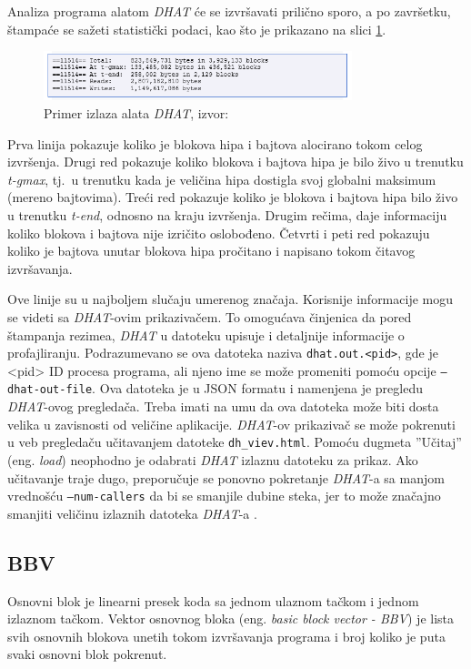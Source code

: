 \documentclass[12pt,oneside]{memoir}
\theoremstyle{plain}
\theoremstyle{definition}
\begin{document}
Analiza programa alatom \textit{DHAT} će se izvršavati prilično sporo, a po završetku, štampaće se sažeti statistički podaci, kao što je prikazano na slici \ref{fig:slika2.24}.
\begin{figure}[!ht]
  \centering
  \includegraphics[width=0.8\textwidth]{DHAT.png}
  \caption{Primer izlaza alata \textit{DHAT}, izvor: \cite{DHAT}}
  \label{fig:slika2.24}
\end{figure}

Prva linija pokazuje koliko je blokova hipa i bajtova alocirano tokom celog izvršenja. Drugi red pokazuje koliko blokova i bajtova hipa je bilo živo u trenutku \textit{t-gmax}, tj.~u trenutku kada je veličina hipa dostigla svoj globalni maksimum (mereno bajtovima). Treći red pokazuje koliko je blokova i bajtova hipa bilo živo u trenutku \textit{t-end}, odnosno na kraju izvršenja. Drugim rečima, daje informaciju koliko blokova i bajtova nije izričito oslobođeno. Četvrti i peti red pokazuju koliko je bajtova unutar blokova hipa pročitano i napisano tokom čitavog izvršavanja.

Ove linije su u najboljem slučaju umerenog značaja. Korisnije informacije mogu se videti sa \textit{DHAT}-ovim prikazivačem. To omogućava činjenica da pored štampanja rezimea, \textit{DHAT} u datoteku upisuje i detaljnije informacije o profajliranju. Podrazumevano se ova datoteka naziva \texttt{dhat.out.<pid>}, gde je <pid> ID procesa programa, ali njeno ime se može promeniti pomoću opcije \texttt{--dhat-out-file}. Ova datoteka je u JSON formatu i namenjena je pregledu \textit{DHAT}-ovog pregledača. Treba imati na umu da ova datoteka može biti dosta velika u zavisnosti od veličine aplikacije. 
\textit{DHAT}-ov prikazivač se može pokrenuti u veb pregledaču učitavanjem datoteke \texttt{dh\_viev.html}. Pomoću dugmeta ''Učitaj'' (eng. \textit{load}) neophodno je odabrati \textit{DHAT} izlaznu datoteku za prikaz. Ako učitavanje traje dugo, preporučuje se ponovno pokretanje \textit{DHAT}-a sa manjom vrednošću \texttt{--num-callers} da bi se smanjile dubine steka, jer to može značajno smanjiti veličinu izlaznih datoteka \textit{DHAT}-a \cite{DHAT}. 

\subsection{BBV}
Osnovni blok je linearni presek koda sa jednom ulaznom tačkom i jednom izlaznom tačkom. Vektor osnovnog bloka (eng. \textit{basic block vector - BBV}) je lista svih osnovnih blokova unetih tokom izvršavanja programa i broj koliko je puta svaki osnovni blok pokrenut.
\end{document}
